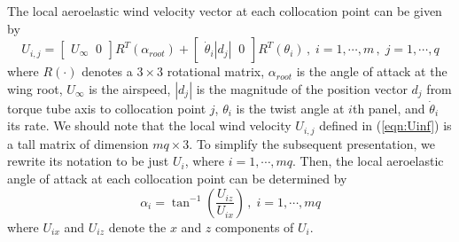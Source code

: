 \documentclass[11pt]{ucthesis}
\begin{document}
The local aeroelastic wind velocity vector at each collocation point can be given by
\begin{equation}
U_{i,j} =\begin{bmatrix}U_{\infty} \;\; 0\end{bmatrix} R^T(\alpha_{root}) + \begin{bmatrix}\dot{\theta}_{i} |d_{j}| \;\; 0\end{bmatrix} R^T (\theta_{i}) \,,\;i=1,\cdots, m\,,\;j=1,\cdots, q
\label{eqn:Uinf}
\end{equation}
where $R(\cdot)$ denotes a $3\times 3$ rotational matrix, $\alpha_{root}$ is the angle of attack at the wing root, $U_{\infty}$ is the airspeed, $|d_{j}|$ is the magnitude of the position vector $d_{j}$ from torque tube axis to collocation point $j$, $\theta_i$ is the twist angle at $i$th panel, and $\dot{\theta}_i$ its rate. We should note that the local wind velocity $U_{i,j}$ defined in (\ref{eqn:Uinf}) is a tall matrix of dimension $mq \times 3$. To simplify the subsequent presentation, we rewrite its notation to be just $U_i$, where $i=1,\cdots,mq$. Then, the local aeroelastic angle of attack at each collocation point can be determined by
\begin{equation}
\alpha_{i} = \tan^{-1} \left (\frac{U_{iz}}{U_{ix}} \right) \,,\;i=1,\cdots, mq
\label{eqn:alpha_aero}
\end{equation}
where $U_{ix}$ and $U_{iz}$ denote the $x$ and $z$ components of $U_{i}$. 
\end{document}
